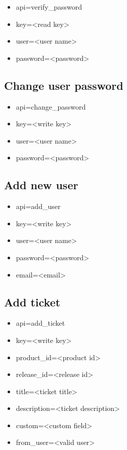 \documentclass[11pt]{article}
\begin{document}
\begin{itemize}
\item api=verify\_password
\item key=<read key>
\item user=<user name>
\item password=<password>
\end{itemize}

\subsection{Change user password}

\begin{itemize}
\item api=change\_password
\item key=<write key>
\item user=<user name>
\item password=<password>
\end{itemize}

\subsection{Add new user}

\begin{itemize}
\item api=add\_user
\item key=<write key>
\item user=<user name>
\item password=<password>
\item email=<email>
\end{itemize}

\subsection{Add ticket}

\begin{itemize}
\item api=add\_ticket
\item key=<write key>
\item product\_id=<product id>
\item release\_id=<release id>
\item title=<ticket title>
\item description=<ticket description>
\item custom=<custom field>
\item from\_user=<valid user>
\end{itemize}
\end{document}
